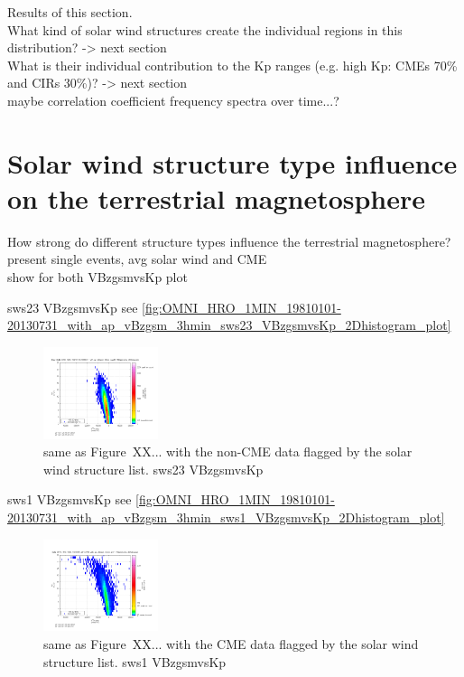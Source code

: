 Results of this section.\\
What kind of solar wind structures create the individual regions in this distribution? -> next section\\
What is their individual contribution to the Kp ranges (e.g. high Kp: CMEs 70\% and CIRs 30\%)? -> next section\\

maybe correlation coefficient frequency spectra over time...?\\


\section{Solar wind structure type influence on the terrestrial magnetosphere}

How strong do different structure types influence the terrestrial magnetosphere?\\

present single events, avg solar wind and CME\\
show for both VBzgsmvsKp plot

sws23 VBzgsmvsKp see \autoref{fig:OMNI_HRO_1MIN_19810101-20130731_with_ap_vBzgsm_3hmin_sws23_VBzgsmvsKp_2Dhistogram_plot}
\begin{figure}[htb]
	\centering
	\includegraphics[width=0.3\textwidth]{images/gnuplots/OMNI_HRO_1MIN_19810101-20130731_with_ap_vBzgsm_3hmin_sws23_VBzgsmvsKp_2Dhistogram_plot.png}
	\caption{same as Figure~XX... with the non-CME data flagged by the solar wind structure list. sws23 VBzgsmvsKp}
	\label{fig:OMNI_HRO_1MIN_19810101-20130731_with_ap_vBzgsm_3hmin_sws23_VBzgsmvsKp_2Dhistogram_plot}
\end{figure}

sws1 VBzgsmvsKp see \autoref{fig:OMNI_HRO_1MIN_19810101-20130731_with_ap_vBzgsm_3hmin_sws1_VBzgsmvsKp_2Dhistogram_plot}
\begin{figure}[htb]
	\centering
	\includegraphics[width=0.3\textwidth]{images/gnuplots/OMNI_HRO_1MIN_19810101-20130731_with_ap_vBzgsm_3hmin_sws1_VBzgsmvsKp_2Dhistogram_plot.png}
	\caption{same as Figure~XX... with the CME data flagged by the solar wind structure list. sws1 VBzgsmvsKp}
	\label{fig:OMNI_HRO_1MIN_19810101-20130731_with_ap_vBzgsm_3hmin_sws1_VBzgsmvsKp_2Dhistogram_plot}
\end{figure}

